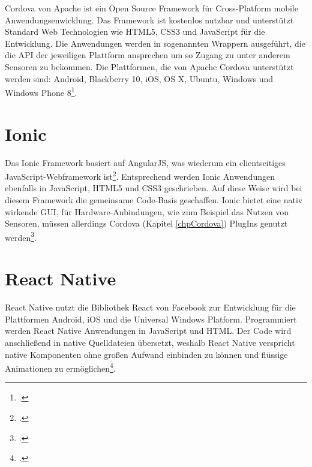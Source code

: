 Cordova von Apache ist ein Open Source Framework für Cross-Platform mobile Anwendungsenwicklung. Das Framework ist kostenlos nutzbar und unterstützt Standard Web Technologien wie HTML5, CSS3 und JavaScript für die Entwicklung. Die Anwendungen werden in sogenannten Wrappern ausgeführt, die die API der jeweiligen Plattform ansprechen um so Zugang zu unter anderem Sensoren zu bekommen. Die Plattformen, die von Apache Cordova unterstützt werden sind: Android, Blackberry 10, iOS, OS X, Ubuntu, Windows und Windows Phone 8\footcite{Cordova}. 

\section{Ionic}

Das Ionic Framework basiert auf AngularJS, was wiederum ein clientseitiges JavaScript-Webframework ist\footcite{AngularJS}. Entsprechend werden Ionic Anwendungen ebenfalls in JavaScript, HTML5 und CSS3 geschrieben. Auf diese Weise wird bei diesem Framework die gemeinsame Code-Basis geschaffen. Ionic bietet eine nativ wirkende GUI, für Hardware-Anbindungen, wie zum Beispiel das Nutzen von Sensoren, müssen allerdings Cordova (Kapitel  \ref{chpCordova}) PlugIns genutzt werden\footcite{Ionic}. 

\section{React Native}

React Native nutzt die Bibliothek React von Facebook zur Entwicklung für die Plattformen Android, iOS und die Universal Windows Platform. Programmiert werden React Native Anwendungen in JavaScript und HTML. Der Code wird anschließend in native Quelldateien übersetzt, weshalb React Native verspricht native Komponenten ohne großen Aufwand einbinden zu können und flüssige Animationen zu ermöglichen\footcite{EinerFuerAlles}.
